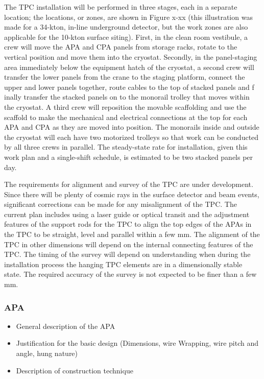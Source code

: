   The TPC installation will be performed in three stages, each in a separate location; the locations, or 
  zones, are shown in Figure x-xx (this illustration was made for a 34-kton, in-line underground 
  detector, but the work zones are also applicable for the 10-kton surface siting). First, in the clean room 
  vestibule, a crew will move the APA and CPA panels from storage racks, rotate to the vertical position 
  and move them into the cryostat. Secondly, in the panel-staging area immediately below the equipment 
  hatch of the cryostat, a second crew will transfer the lower panels from the crane to the staging 
  platform, connect the upper and lower panels together, route cables to the top of stacked panels and f
  inally transfer the stacked panels on to the monorail trolley that moves within the cryostat. A third crew 
  will reposition the movable scaffolding and use the scaffold to make the mechanical and electrical 
  connections at the top for each APA and CPA as they are moved into position. The monorails inside and 
  outside the cryostat will each have two motorized trolleys so that work can be conducted by all three 
  crews in parallel. The steady-state rate for installation, given this work plan and a single-shift schedule, 
  is estimated to be two stacked panels per day.  

The requirements for alignment and survey of the TPC are under development. Since there will be plenty 
of cosmic rays in the surface detector and beam events, significant corrections can be made for any 
misalignment of the TPC. The current plan includes using a laser guide or optical transit and the 
adjustment features of the support rods for the TPC to align the top edges of the APAs in the TPC to be 
straight, level and parallel within a few mm. The alignment of the TPC in other dimensions will depend on 
the internal connecting features of the TPC.  The timing of the survey will depend on understanding when 
during the installation process the hanging TPC elements are in a dimensionally stable state. The 
required accuracy of the survey is not expected to be finer than a few mm.  

\subsubsection{APA}
\begin{itemize}
\item General description of the APA
\item Justification for the basic design (Dimensions, wire Wrapping, wire pitch and angle, hung nature)
\item Description of construction technique
\end{itemize}

